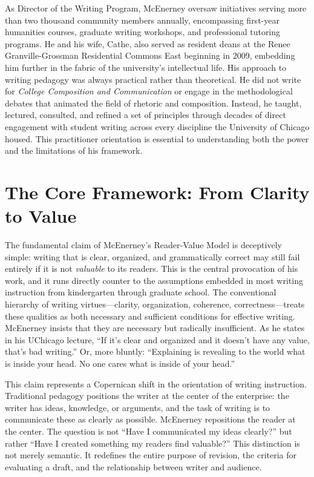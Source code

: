 \documentclass[12pt]{article}
\begin{document}
As Director of the Writing Program, McEnerney oversaw initiatives serving more than two thousand community members annually, encompassing first-year humanities courses, graduate writing workshops, and professional tutoring programs. He and his wife, Cathe, also served as resident deans at the Renee Granville-Grossman Residential Commons East beginning in 2009, embedding him further in the fabric of the university's intellectual life. His approach to writing pedagogy was always practical rather than theoretical. He did not write for \textit{College Composition and Communication} or engage in the methodological debates that animated the field of rhetoric and composition. Instead, he taught, lectured, consulted, and refined a set of principles through decades of direct engagement with student writing across every discipline the University of Chicago housed. This practitioner orientation is essential to understanding both the power and the limitations of his framework.

\section*{The Core Framework: From Clarity to Value}

The fundamental claim of McEnerney's Reader-Value Model is deceptively simple: writing that is clear, organized, and grammatically correct may still fail entirely if it is not \textit{valuable} to its readers. This is the central provocation of his work, and it runs directly counter to the assumptions embedded in most writing instruction from kindergarten through graduate school. The conventional hierarchy of writing virtues---clarity, organization, coherence, correctness---treats these qualities as both necessary and sufficient conditions for effective writing. McEnerney insists that they are necessary but radically insufficient. As he states in his UChicago lecture, ``If it's clear and organized and it doesn't have any value, that's bad writing.'' Or, more bluntly: ``Explaining is revealing to the world what is inside your head. No one cares what is inside of your head.''

This claim represents a Copernican shift in the orientation of writing instruction. Traditional pedagogy positions the writer at the center of the enterprise: the writer has ideas, knowledge, or arguments, and the task of writing is to communicate these as clearly as possible. McEnerney repositions the reader at the center. The question is not ``Have I communicated my ideas clearly?'' but rather ``Have I created something my readers find valuable?'' This distinction is not merely semantic. It redefines the entire purpose of revision, the criteria for evaluating a draft, and the relationship between writer and audience.
\end{document}
